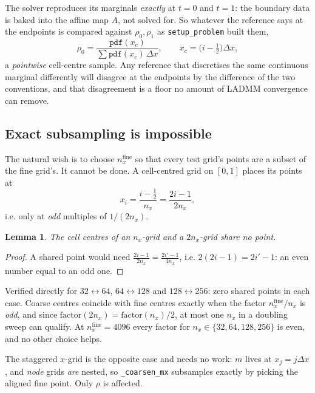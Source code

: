 \documentclass[11pt]{article}
\newtheorem{lemma}{Lemma}
\newcommand{\dx}{\Delta x}
\newcommand{\code}[1]{\texttt{#1}}
\begin{document}
The solver reproduces its marginals \emph{exactly} at $t=0$ and $t=1$: the
boundary data is baked into the affine map $A$, not solved for. So whatever the
reference says at the endpoints is compared against $\rho_0,\rho_1$ as
\code{setup\_problem} built them,
\begin{equation}
  \rho_0 = \frac{\texttt{pdf}(x_c)}{\sum \texttt{pdf}(x_c)\,\dx},
  \qquad x_c = \bigl(i-\tfrac12\bigr)\dx,
  \label{eq:solvermarginal}
\end{equation}
a \emph{pointwise} cell-centre sample. Any reference that discretises the same
continuous marginal differently will disagree at the endpoints by the
difference of the two conventions, and that disagreement is a floor no amount
of LADMM convergence can remove.

\subsection{Exact subsampling is impossible}

The natural wish is to choose $n_x^{\text{fine}}$ so that every test grid's
points are a subset of the fine grid's. It cannot be done. A cell-centred grid
on $[0,1]$ places its points at
\begin{equation}
  x_i = \frac{i-\tfrac12}{n_x} = \frac{2i-1}{2n_x},
\end{equation}
i.e. only at \emph{odd} multiples of $1/(2n_x)$.

\begin{lemma}
The cell centres of an $n_x$-grid and a $2n_x$-grid share no point.
\end{lemma}
\begin{proof}
A shared point would need $\tfrac{2i-1}{2n_x} = \tfrac{2i'-1}{4n_x}$, i.e.
$2(2i-1) = 2i'-1$: an even number equal to an odd one.
\end{proof}

\noindent
Verified directly for $32\!\leftrightarrow\!64$, $64\!\leftrightarrow\!128$ and
$128\!\leftrightarrow\!256$: zero shared points in each case. Coarse centres
coincide with fine centres exactly when the factor $n_x^{\text{fine}}/n_x$ is
\emph{odd}, and since $\text{factor}(2n_x)=\text{factor}(n_x)/2$, at most one
$n_x$ in a doubling sweep can qualify. At $n_x^{\text{fine}}=4096$ every factor
for $n_x\in\{32,64,128,256\}$ is even, and no other choice helps.

The staggered $x$-grid is the opposite case and needs no work: $m$ lives at
$x_j = j\dx$, and \emph{node} grids \emph{are} nested, so
\code{\_coarsen\_mx} subsamples exactly by picking the aligned fine point.
Only $\rho$ is affected.
\end{document}
